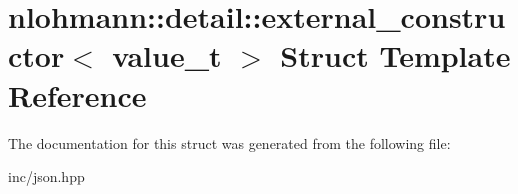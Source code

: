 \hypertarget{structnlohmann_1_1detail_1_1external__constructor}{}\section{nlohmann\+:\+:detail\+:\+:external\+\_\+constructor$<$ value\+\_\+t $>$ Struct Template Reference}
\label{structnlohmann_1_1detail_1_1external__constructor}


The documentation for this struct was generated from the following file\+:\begin{DoxyCompactItemize}
\item 
inc/json.\+hpp\end{DoxyCompactItemize}

